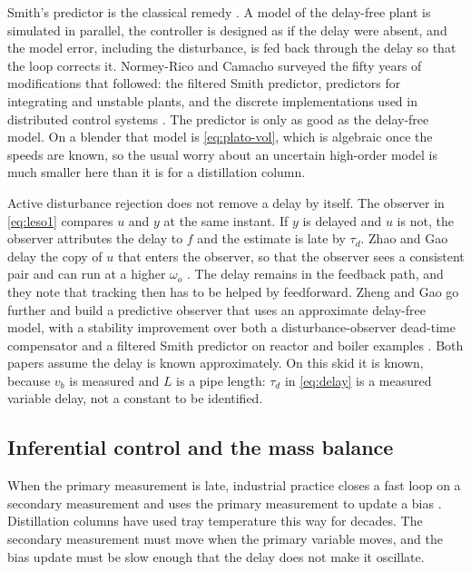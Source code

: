 Smith's predictor is the classical remedy \cite{smith1957closer}. A model of the delay-free plant is simulated in parallel, the controller is designed as if the delay were absent, and the model error, including the disturbance, is fed back through the delay so that the loop corrects it. Normey-Rico and Camacho surveyed the fifty years of modifications that followed: the filtered Smith predictor, predictors for integrating and unstable plants, and the discrete implementations used in distributed control systems \cite{normey2008survey,normey2007book}. The predictor is only as good as the delay-free model. On a blender that model is \eqref{eq:plato-vol}, which is algebraic once the speeds are known, so the usual worry about an uncertain high-order model is much smaller here than it is for a distillation column.

Active disturbance rejection does not remove a delay by itself. The observer in \eqref{eq:leso1} compares $u$ and $y$ at the same instant. If $y$ is delayed and $u$ is not, the observer attributes the delay to $f$ and the estimate is late by $\tau_d$. Zhao and Gao delay the copy of $u$ that enters the observer, so that the observer sees a consistent pair and can run at a higher $\omega_o$ \cite{zhao2014delay}. The delay remains in the feedback path, and they note that tracking then has to be helped by feedforward. Zheng and Gao go further and build a predictive observer that uses an approximate delay-free model, with a stability improvement over both a disturbance-observer dead-time compensator and a filtered Smith predictor on reactor and boiler examples \cite{zheng2014predictive}. Both papers assume the delay is known approximately. On this skid it is known, because $v_b$ is measured and $L$ is a pipe length: $\tau_d$ in \eqref{eq:delay} is a measured variable delay, not a constant to be identified.

\subsection{Inferential control and the mass balance}

When the primary measurement is late, industrial practice closes a fast loop on a secondary measurement and uses the primary measurement to update a bias \cite{seborg2016process,stephanopoulos1984chemical,luyben1990process}. Distillation columns have used tray temperature this way for decades. The secondary measurement must move when the primary variable moves, and the bias update must be slow enough that the delay does not make it oscillate.

